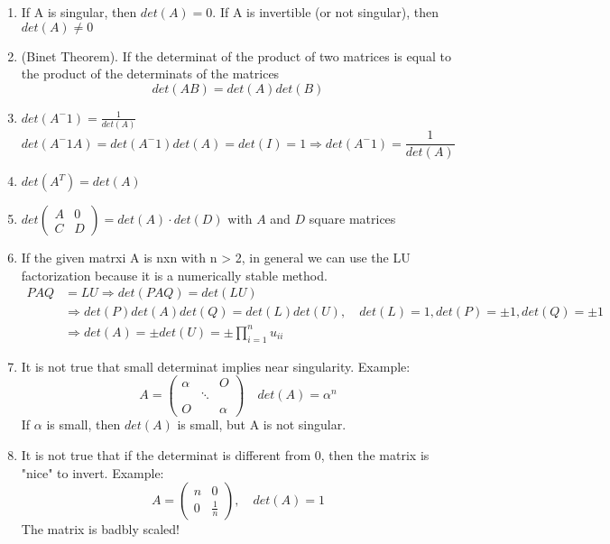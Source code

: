 \begin{enumerate}
    \item If A is singular, then $det(A) = 0$. If A is invertible (or not singular), then $det(A) \neq 0$
    \item (Binet Theorem). If the determinat of the product of two matrices is equal to the product of the determinats of the matrices
          $$ det(AB) = det(A)det(B)$$
    \item $det(A^-1) = \frac{1}{det(A)}$
          $$ det(A^-1A) = det(A^-1)det(A) = det(I) = 1 \Rightarrow det(A^-1) = \frac{1}{det(A)}$$
    \item $det(A^T) = det(A)$
    \item $det\begin{pmatrix}
        A & 0 \\
        C & D\end{pmatrix} = det(A) \cdot det(D)$ with $A$ and $D$ square matrices
    \item If the given matrxi A is nxn with n > 2, in general we can use the LU factorization because it is a numerically stable method.
          $$
          \begin{aligned}
            PAQ &= LU \Rightarrow det(PAQ) = det(LU) \\
            & \Rightarrow det(P)det(A)det(Q) = det(L)det(U), \quad det(L) = 1, det(P) = \pm 1, det(Q) = \pm 1  \\
            &\Rightarrow det(A) = \pm det(U) = \pm \prod_{i = 1}^{n} u_{ii}
          \end{aligned}
          $$
    \item It is not true that small determinat implies near singularity.
          Example:
          $$ A = \begin{pmatrix}
              \alpha & & O \\
                & \ddots & \\
                O & & \alpha
            \end{pmatrix} \quad det(A) = \alpha^n $$
            If $\alpha$ is small, then $det(A)$ is small, but A is not singular.
    \item It is not true that if the determinat is different from 0, then the matrix is "nice" to invert.
          Example: 
            $$ A = \begin{pmatrix}
                n & 0 \\
                0 & \frac{1}{n}
            \end{pmatrix}, \quad det(A) = 1 $$
            The matrix is badbly scaled!
\end{enumerate}

